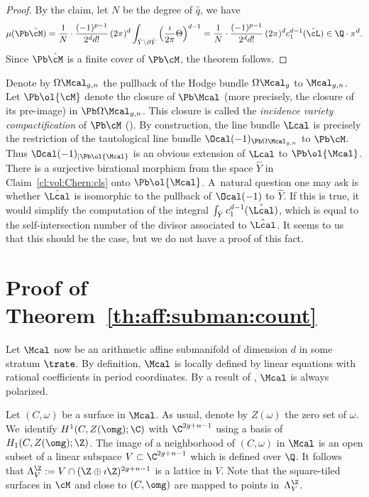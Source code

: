 \begin{proof}
By the claim, let $N$ be the degree of $\hat{q}$, we have
\[
\mu(\Pb\hat{\cM})=\frac{1}{N}\cdot\frac{(-1)^{p-1}}{2^d d!}\,(2\pi)^d\int_{\hat{Y}\setminus\partial\hat{Y}}\left(\frac{\imath}{2\pi}\Theta\right)^{d-1} = \frac{1}{N}\cdot\frac{(-1)^{p-1}}{2^d d!}\,(2\pi)^d c_1^{d-1}(\hat{\cL})\in \Q\cdot\pi^d.
\]
Since $\Pb\hat{\cM}$ is a finite cover of $\Pb\cM$, the theorem follows.
\end{proof}

\begin{Remark}\label{rk:compare:ext:line:bdl}
Denote by $\Omega\Mcal_{g,n}$ the pullback of the Hodge bundle $\Omega\Mcal_g$ to $\Mcal_{g,n}$.
Let $\Pb\ol{\cM}$ denote the closure of $\Pb\Mcal$ (more precisely, the closure of its pre-image) in $\Pb\Omega\Mcal_{g,n}$.
This closure is called the \emph{incidence variety compactification} of $\Pb\cM$ (\cf \cite{BCGGM:abel}).
By construction, the line bundle $\Lcal$ is precisely the restriction of the tautological line bundle $\Ocal(-1)_{\Pb\Omega\Mcal_{g,n}}$ to $\Pb\cM$.
Thus $\Ocal(-1)_{|\Pb\ol{\Mcal}}$ is an obvious extension of $\Lcal$ to $\Pb\ol{\Mcal}$.
There is a surjective birational morphism from the space $\hat{Y}$ in Claim~\ref{cl:vol:Chern:cls} onto $\Pb\ol{\Mcal}$.
A~natural question one may ask is whether $\hat{\Lcal}$ is isomorphic to the pullback of $\Ocal(-1)$ to $\hat{Y}$.
If this is true, it would simplify the computation of the integral $\int_{\hat{Y}}c_1^{d-1}(\hat{\Lcal})$, which is equal to the self-intersection number of the divisor associated to $\hat{\Lcal}$.
It seems to us that this should be the case, but we do not have a proof of this fact.
\end{Remark}

\section{Proof of Theorem~\ref{th:aff:subman:count}}\label{sec:proof:theorem2}
Let $\Mcal$ now be an arithmetic affine submanifold of dimension $d$ in some stratum $\trate$.
By definition, $\Mcal$ is locally defined by linear equations with rational coefficients in period coordinates.
By a result of \cite{AEM17}, $\Mcal$ is always polarized.

Let $(C,\omega)$ be a surface in $\Mcal$. As usual, denote by $Z(\omega)$ the zero set of $\omega$.
We~identify $H^1(C,Z(\omg);\C)$ with $\C^{2g+n-1}$ using a basis of $H_1(C,Z(\omg);\Z)$.
The image of a neighborhood of $(C,\omega)$ in $\Mcal$ is an open subset of a linear subspace $V\subset \C^{2g+n-1}$ which is defined over $\Q$.
It follows that $\Lambda^\Z_V:=V\cap (\Z\oplus\imath\Z)^{2g+n-1}$ is a lattice in $V$.
Note that the square-tiled surfaces in $\cM$ and close to $(C,\omg)$ are mapped to points in~$\Lambda^\Z_V$.

